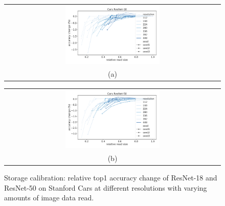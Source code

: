 \begin{figure}
    \centering
    \begin{tabular}{@{}c@{}}
    \includegraphics[width=0.45\textwidth]{e2e_figures/calibration_carsresnet18.pdf}\\
    \small (a)
    \end{tabular}
    \begin{tabular}{@{}c@{}}
    \includegraphics[width=0.45\textwidth]{e2e_figures/calibration_carsresnet50.pdf}\\
    \small (b)
    \end{tabular}
    \caption{Storage calibration: relative top1 accuracy change of ResNet-18 and ResNet-50 on Stanford Cars at different resolutions with varying amounts of image data read.}
    \label{fig:calibration_cars_ssim}
\end{figure}

